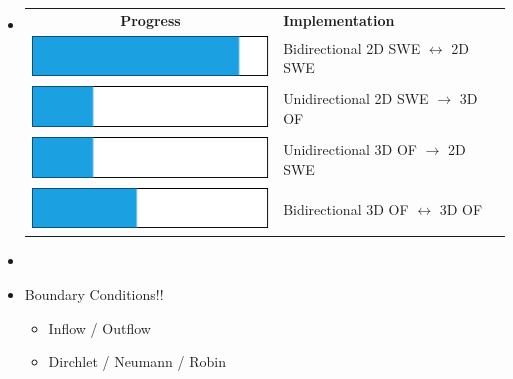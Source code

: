 

\begin{frame}
\begin{multicols}{2}
\begin{itemize}
\item<1->[]
{\renewcommand{\arraystretch}{2.5} %
\begin{table}[]
\begin{tabular}{ cl }
{\large\textbf{Progress}} & {\large\hspace{5pt} \textbf{Implementation}}\\
\includegraphics[scale=0.5]{./Resources/Images/bar1.png} & \hspace{5pt}Bidirectional 2D SWE $\leftrightarrow$ 2D SWE  \\ 
\includegraphics[scale=0.5]{./Resources/Images/bar2.png} &\hspace{5pt} Unidirectional 2D SWE $\rightarrow$ 3D OF \\ 
\includegraphics[scale=0.5]{./Resources/Images/bar2.png} &\hspace{5pt} Unidirectional 3D OF $\rightarrow$ 2D SWE \\ 
\includegraphics[scale=0.5]{./Resources/Images/bar3.png} & \hspace{5pt} Bidirectional 3D OF $\leftrightarrow$ 3D OF \\
\end{tabular}

\end{table}
}

\vfill\columnbreak

\item<2->[] \\[2.5cm]
\item<3->[] {\Large\hspace{0.23\columnwidth}Boundary Conditions!!}
\begin{itemize}
 \setlength{\itemindent}{3.5cm}
\vspace{0.5cm}
\item<4-> Inflow / Outflow 
\item<4-> Dirchlet / Neumann / Robin
\end{itemize}
\end{itemize}
\end{multicols}
\end{frame}

